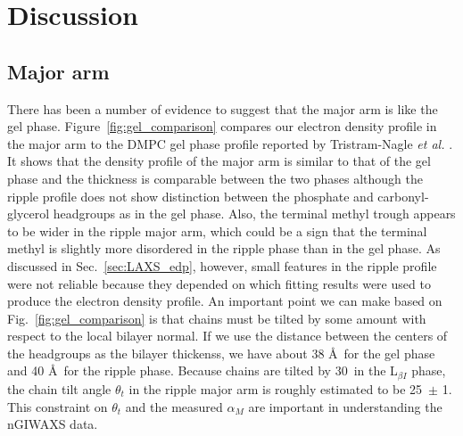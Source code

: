 
\newpage
\section{Discussion}\label{sec:ripple_discussion}
\subsection{Major arm}
There has been a number of evidence to suggest that the major arm is like 
the gel phase. Figure~\ref{fig:gel_comparison} compares our electron density
profile in the major arm to the DMPC gel phase profile reported by 
Tristram-Nagle \textit{et al.} \cite{Tristram-Nagle02}. 
It shows that the density profile of the major arm is similar to that 
of the gel phase and the thickness is comparable between the two phases
although the ripple profile does not show distinction
between the phosphate and carbonyl-glycerol headgroups as in the gel phase.
Also, the terminal methyl trough appears to be wider in the ripple major arm,
which could be a sign that the terminal methyl is slightly more disordered
in the ripple phase than in the gel phase.
As discussed in
Sec.~\ref{sec:LAXS_edp}, however, small features in the ripple profile were not
reliable because they depended on which fitting results were used
to produce the electron density profile.
An important point we can make based on Fig.~\ref{fig:gel_comparison} 
is that chains must be tilted by some amount with respect to the local bilayer
normal. If we use the distance between the centers of the headgroups as the
bilayer thickenss, we have about 38 \AA\ for the gel phase and 40 \AA\
for the ripple phase. Because chains are tilted by 30\textdegree\ in the 
L$_{\beta I}$ phase, the chain tilt angle $\theta_t$ in the ripple major 
arm is roughly estimated to be 25\textdegree\ $\pm$ 1\textdegree. This constraint on $\theta_t$
and the measured $\alpha_M$ are important in understanding the nGIWAXS data.

